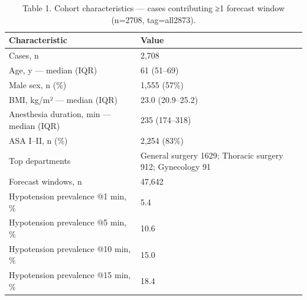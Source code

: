 \begin{table}[t]\centering\footnotesize
\caption{Table 1. Cohort characteristics — cases contributing ≥1 forecast window (n=2708, tag=all2873).}
\begin{tabular}{ll}
\toprule
Characteristic & Value \\
\midrule
Cases, n & 2,708 \\
Age, y — median (IQR) & 61 (51–69) \\
Male sex, n (\%) & 1,555 (57\%) \\
BMI, kg/m² — median (IQR) & 23.0 (20.9–25.2) \\
Anesthesia duration, min — median (IQR) & 235 (174–318) \\
ASA I–II, n (\%) & 2,254 (83\%) \\
Top departments & General surgery 1629; Thoracic surgery 912; Gynecology 91 \\
Forecast windows, n & 47,642 \\
Hypotension prevalence @1 min, \% & 5.4 \\
Hypotension prevalence @5 min, \% & 10.6 \\
Hypotension prevalence @10 min, \% & 15.0 \\
Hypotension prevalence @15 min, \% & 18.4 \\
\bottomrule
\end{tabular}
\end{table}
